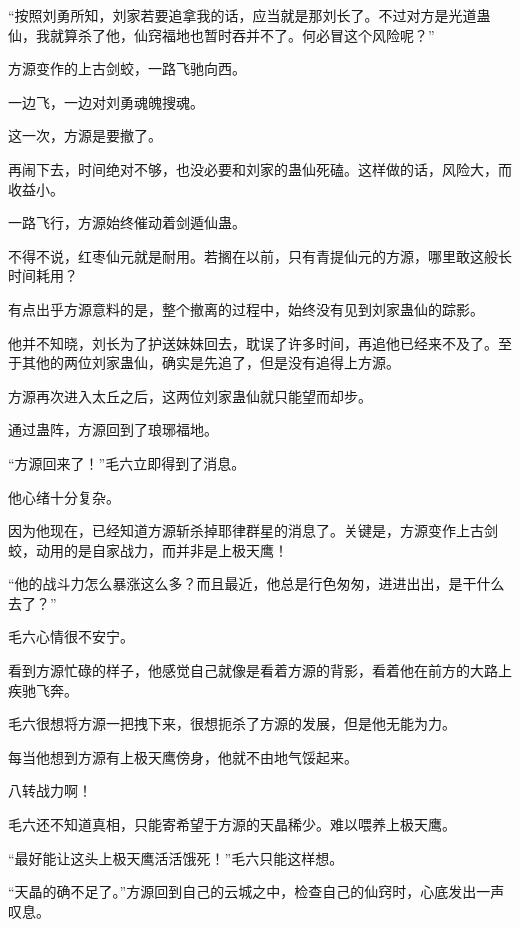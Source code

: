 
\begin{this_body}



“按照刘勇所知，刘家若要追拿我的话，应当就是那刘长了。不过对方是光道蛊仙，我就算杀了他，仙窍福地也暂时吞并不了。何必冒这个风险呢？”

方源变作的上古剑蛟，一路飞驰向西。

一边飞，一边对刘勇魂魄搜魂。

这一次，方源是要撤了。

再闹下去，时间绝对不够，也没必要和刘家的蛊仙死磕。这样做的话，风险大，而收益小。

一路飞行，方源始终催动着剑遁仙蛊。

不得不说，红枣仙元就是耐用。若搁在以前，只有青提仙元的方源，哪里敢这般长时间耗用？

有点出乎方源意料的是，整个撤离的过程中，始终没有见到刘家蛊仙的踪影。

他并不知晓，刘长为了护送妹妹回去，耽误了许多时间，再追他已经来不及了。至于其他的两位刘家蛊仙，确实是先追了，但是没有追得上方源。

方源再次进入太丘之后，这两位刘家蛊仙就只能望而却步。

通过蛊阵，方源回到了琅琊福地。

“方源回来了！”毛六立即得到了消息。

他心绪十分复杂。

因为他现在，已经知道方源斩杀掉耶律群星的消息了。关键是，方源变作上古剑蛟，动用的是自家战力，而并非是上极天鹰！

“他的战斗力怎么暴涨这么多？而且最近，他总是行色匆匆，进进出出，是干什么去了？”

毛六心情很不安宁。

看到方源忙碌的样子，他感觉自己就像是看着方源的背影，看着他在前方的大路上疾驰飞奔。

毛六很想将方源一把拽下来，很想扼杀了方源的发展，但是他无能为力。

每当他想到方源有上极天鹰傍身，他就不由地气馁起来。

八转战力啊！

毛六还不知道真相，只能寄希望于方源的天晶稀少。难以喂养上极天鹰。

“最好能让这头上极天鹰活活饿死！”毛六只能这样想。

“天晶的确不足了。”方源回到自己的云城之中，检查自己的仙窍时，心底发出一声叹息。


\end{this_body}
